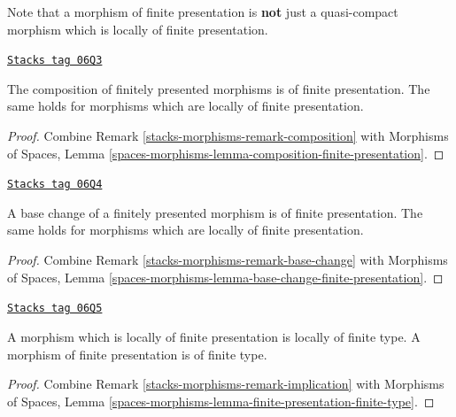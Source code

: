 Note that a morphism of finite presentation is {\bf not} just a quasi-compact
morphism which is locally of finite presentation.

\begin{lemma}
\label{stacks-morphisms-lemma-composition-finite-presentation}
\href{https://stacks.math.columbia.edu/tag/06Q3}{\texttt{Stacks tag 06Q3}}

The composition of finitely presented morphisms is of finite presentation.
The same holds for morphisms which are locally of finite presentation.
\end{lemma}

\begin{proof}
Combine
Remark \ref{stacks-morphisms-remark-composition}
with
Morphisms of Spaces, Lemma
\ref{spaces-morphisms-lemma-composition-finite-presentation}.
\end{proof}

\begin{lemma}
\label{stacks-morphisms-lemma-base-change-finite-presentation}
\href{https://stacks.math.columbia.edu/tag/06Q4}{\texttt{Stacks tag 06Q4}}

A base change of a finitely presented morphism is of finite presentation.
The same holds for morphisms which are locally of finite presentation.
\end{lemma}

\begin{proof}
Combine
Remark \ref{stacks-morphisms-remark-base-change}
with
Morphisms of Spaces, Lemma
\ref{spaces-morphisms-lemma-base-change-finite-presentation}.
\end{proof}

\begin{lemma}
\label{stacks-morphisms-lemma-finite-presentation-finite-type}
\href{https://stacks.math.columbia.edu/tag/06Q5}{\texttt{Stacks tag 06Q5}}

A morphism which is locally of finite presentation is locally of finite type.
A morphism of finite presentation is of finite type.
\end{lemma}

\begin{proof}
Combine
Remark \ref{stacks-morphisms-remark-implication}
with
Morphisms of Spaces, Lemma
\ref{spaces-morphisms-lemma-finite-presentation-finite-type}.
\end{proof}


